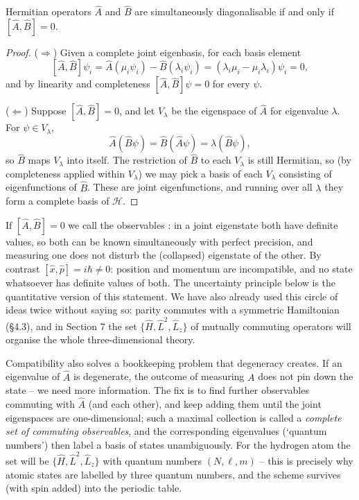 \documentclass[a4paper]{scrartcl}
\begin{document}
\begin{theorem}
    Hermitian operators $\hat{A}$ and $\hat{B}$ are simultaneously diagonalisable if and only if $[\hat{A}, \hat{B}] = 0$.
\end{theorem}
\begin{proof}
    ($\Rightarrow$) Given a complete joint eigenbasis, for each basis element
    $$
    [\hat{A}, \hat{B}]\psi_i = \hat{A}(\mu_i \psi_i) - \hat{B}(\lambda_i \psi_i) = (\lambda_i \mu_i - \mu_i \lambda_i)\psi_i = 0,
    $$
    and by linearity and completeness $[\hat{A}, \hat{B}]\psi = 0$ for every $\psi$.

    ($\Leftarrow$) Suppose $[\hat{A}, \hat{B}] = 0$, and let $V_\lambda$ be the eigenspace of $\hat{A}$ for eigenvalue $\lambda$. For $\psi \in V_\lambda$,
    $$
    \hat{A}(\hat{B}\psi) = \hat{B}(\hat{A}\psi) = \lambda (\hat{B} \psi),
    $$
    so $\hat{B}$ maps $V_\lambda$ into itself. The restriction of $\hat{B}$ to each $V_\lambda$ is still Hermitian, so (by completeness applied within $V_\lambda$) we may pick a basis of each $V_\lambda$ consisting of eigenfunctions of $\hat{B}$. These are joint eigenfunctions, and running over all $\lambda$ they form a complete basis of $\mathcal{H}$.
\end{proof}

If $[\hat{A}, \hat{B}] = 0$ we call the observables : in a joint eigenstate both have definite values, so both can be known simultaneously with perfect precision, and measuring one does not disturb the (collapsed) eigenstate of the other. By contrast $[\hat{x}, \hat{p}] = i\hbar \neq 0$: position and momentum are incompatible, and no state whatsoever has definite values of both. The uncertainty principle below is the quantitative version of this statement. We have also already used this circle of ideas twice without saying so: parity commutes with a symmetric Hamiltonian (\S 4.3), and in Section 7 the set $\{\hat{H}, \hat{L}^2, \hat{L}_z\}$ of mutually commuting operators will organise the whole three-dimensional theory.

\begin{remark}
    Compatibility also solves a bookkeeping problem that degeneracy creates. If an eigenvalue of $\hat{A}$ is degenerate, the outcome of measuring $A$ does not pin down the state -- we need more information. The fix is to find further observables commuting with $\hat{A}$ (and each other), and keep adding them until the joint eigenspaces are one-dimensional; such a maximal collection is called a \emph{complete set of commuting observables}, and the corresponding eigenvalues (`quantum numbers') then label a basis of states unambiguously. For the hydrogen atom the set will be $\{\hat H, \hat L^2, \hat L_z\}$ with quantum numbers $(N, \ell, m)$ -- this is precisely why atomic states are labelled by three quantum numbers, and the scheme survives (with spin added) into the periodic table.
\end{remark}
\end{document}

